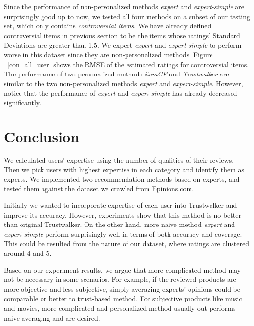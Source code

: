 \documentclass[12pt]{article}
\begin{document}
Since the performance of non-personalized methods \emph{expert} and \emph{expert-simple} are surprisingly good up to now, we tested all four methods on a subset of our testing set, which only contains \emph{controversial items}. We have already defined controversial items in previous section to be the items whose ratings' Standard Deviations are greater than 1.5. We expect \emph{expert} and \emph{expert-simple} to perform worse in this dataset since they are non-personalized methods. Figure ~\ref{con_all_user} shows the RMSE of the estimated ratings for controversial items. The performance of two personalized methods \emph{itemCF} and \emph{Trustwalker} are similar to the two non-personalized methods \emph{expert} and \emph{expert-simple}. However, notice that the performance of \emph{expert} and \emph{expert-simple} has already decreased significantly. 

\section{Conclusion}
We calculated users' expertise using the number of qualities of their reviews. Then we pick users with highest expertise in each category and identify them as experts. We implemented two recommendation methods based on experts, and tested them against the dataset we crawled from Epinions.com. 

Initially we wanted to incorporate expertise of each user into Trustwalker and improve its accuracy. However, experiments show that this method is no better than original Trustwalker. On the other hand, more naive method \emph{expert} and \emph{expert-simple} perform surprisingly well in terms of both accuracy and coverage. This could be resulted from the nature of our dataset, where ratings are clustered around 4 and 5. 

Based on our experiment results, we argue that more complicated method may not be necessary in some scenarios. For example, if the reviewed products are more objective and less subjective, simply averaging experts' opinions could be comparable or better to trust-based method. For subjective products like music and movies, more complicated and personalized method usually out-performs naive averaging and are desired. 



\end{document}
